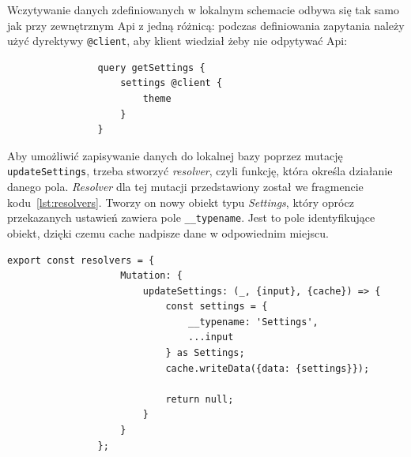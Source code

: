 			Wczytywanie danych zdefiniowanych w lokalnym schemacie odbywa się tak samo jak przy zewnętrznym Api z jedną różnicą:
			podczas definiowania zapytania należy użyć dyrektywy \verb|@client|, aby klient wiedział żeby nie odpytywać Api:
			\begin{lstlisting}
				query getSettings {
					settings @client {
						theme
					}
				}
			\end{lstlisting}

			Aby umożliwić zapisywanie danych do lokalnej bazy poprzez mutację \verb|updateSettings|,
			trzeba stworzyć \emph{resolver}, czyli funkcję, która określa działanie danego pola.
			\emph{Resolver} dla tej mutacji przedstawiony został we fragmencie kodu~\ref{lst:resolvers}.
			Tworzy on nowy obiekt typu \emph{Settings}, który oprócz przekazanych ustawień zawiera pole \verb|__typename|.
			Jest to pole identyfikujące obiekt, dzięki czemu cache nadpisze dane w odpowiednim miejscu.
			\begin{lstlisting}[label=lst:resolvers, caption=\emph{Resolvers} dla lokalnego cache, float=th]
				export const resolvers = {
					Mutation: {
						updateSettings: (_, {input}, {cache}) => {
							const settings = {
								__typename: 'Settings',
								...input
							} as Settings;
							cache.writeData({data: {settings}});

							return null;
						}
					}
				};
			\end{lstlisting}


